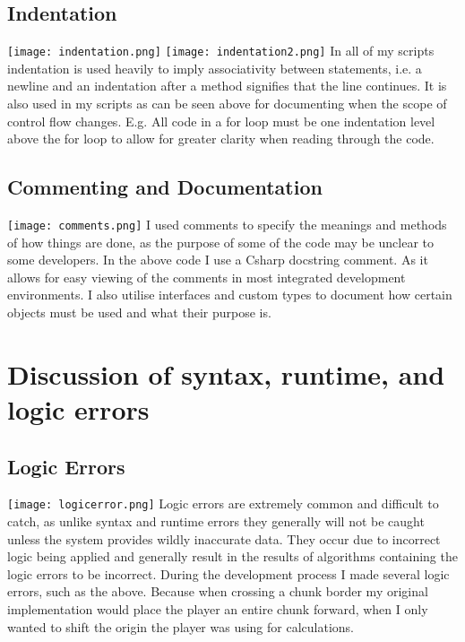 \documentclass[12pt, DIV=calc]{scrartcl}
\begin{document}
\subsection{Indentation}
\texttt{[image: indentation.png]}
\texttt{[image: indentation2.png]}
In all of my scripts indentation is used heavily to imply associativity between statements, i.e. a newline and an indentation after a method signifies that the line continues. It is also used in my scripts as can be seen above for documenting when the scope of control flow changes. E.g. All code in a for loop must be one indentation level above the for loop to allow for greater clarity when reading through the code.

\subsection{Commenting and Documentation}
\texttt{[image: comments.png]} %
I used comments to specify the meanings and methods of how things are done, as the purpose of some of the code may be unclear to some developers. In the above code I use a Csharp docstring comment. As it allows for easy viewing of the comments in most integrated development environments. I also utilise interfaces and custom types to document how certain objects must be used and what their purpose is.



\clearpage
\section{Discussion of syntax, runtime, and logic errors}
\subsection{Logic Errors}
\texttt{[image: logicerror.png]}
Logic errors are extremely common and difficult to catch, as unlike syntax and runtime errors they generally will not be caught unless the system provides wildly inaccurate data. They occur due to incorrect logic being applied and generally result in the results of algorithms containing the logic errors to be incorrect. During the development process I made several logic errors, such as the above. Because when crossing a chunk border my original implementation would place the player an entire chunk forward, when I only wanted to shift the origin the player was using for calculations.
\end{document}
